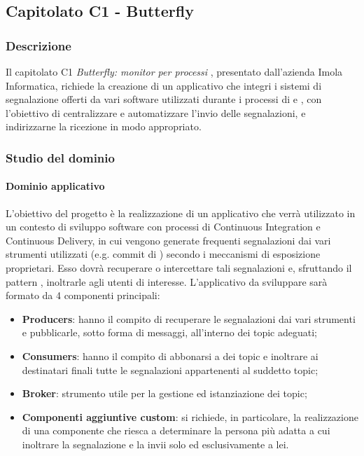 	\subsection{Capitolato C1 - Butterfly}
	\subsubsection{Descrizione}
	Il capitolato C1 \emph{Butterfly: monitor per processi }, presentato dall'azienda Imola Informatica, richiede la creazione di un applicativo che integri i sistemi di segnalazione offerti da vari software utilizzati durante i processi di  e , con l'obiettivo di centralizzare e automatizzare l'invio delle segnalazioni, e indirizzarne la ricezione in modo appropriato. 
	\subsubsection{Studio del dominio}
	\paragraph{Dominio applicativo} \Spazio
	L'obiettivo del progetto è la realizzazione di un applicativo che verrà utilizzato in un contesto di sviluppo software con processi di Continuous Integration e Continuous Delivery, in cui vengono generate frequenti segnalazioni dai vari strumenti utilizzati (e.g. commit di ) secondo i  meccanismi di esposizione proprietari. Esso dovrà recuperare o intercettare tali segnalazioni e, sfruttando il pattern , inoltrarle agli utenti di interesse.
	L'applicativo da sviluppare sarà formato da 4 componenti principali:
	\begin{itemize}	 
		\item \textbf{{Producers}}: hanno il compito di recuperare le segnalazioni dai vari strumenti e pubblicarle, sotto forma di messaggi, all'interno dei
		topic adeguati;
		\item \textbf{{Consumers}}: hanno il compito di abbonarsi a dei topic e inoltrare ai destinatari finali tutte le segnalazioni
		appartenenti al suddetto topic;
		\item \textbf{{Broker}}: strumento utile per la gestione ed istanziazione dei topic;
		\item \textbf{{Componenti aggiuntive custom}}: si richiede, in particolare, la realizzazione di una componente che riesca a determinare la persona più adatta a cui inoltrare la segnalazione e la invii solo ed esclusivamente a lei.
	\end{itemize}
